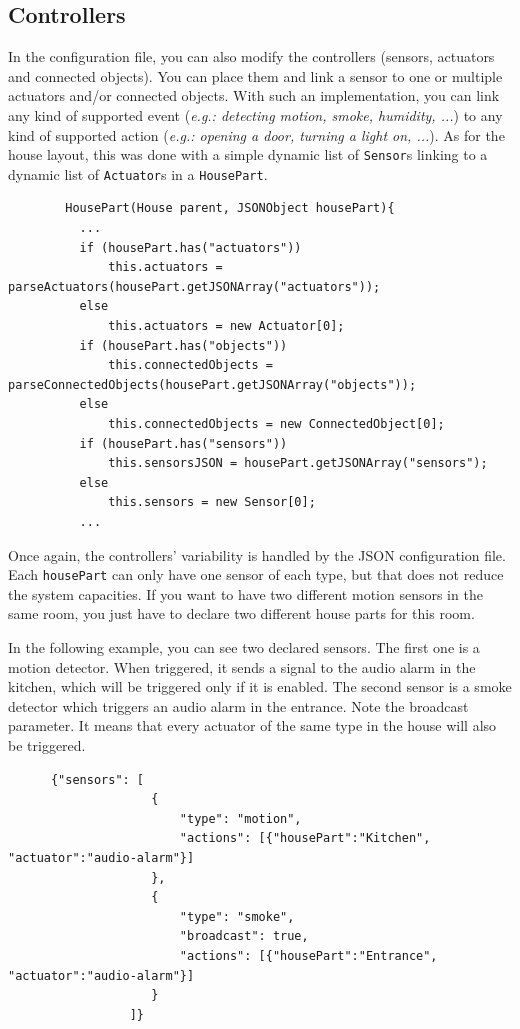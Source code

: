     \subsection{Controllers}
      In the configuration file, you can also modify the controllers (sensors, actuators and connected objects). You can place them and link a sensor to one or multiple actuators and/or connected objects. With such an implementation, you can link any kind of supported event (\emph{e.g.: detecting motion, smoke, humidity, ...}) to any kind of supported action (\emph{e.g.: opening a door, turning a light on, ...}). As for the house layout, this was done with a simple dynamic list of \texttt{Sensor}s linking to a dynamic list of \texttt{Actuator}s in a \texttt{HousePart}.
      \begin{verbatim}
        HousePart(House parent, JSONObject housePart){
          ...
          if (housePart.has("actuators"))
              this.actuators = parseActuators(housePart.getJSONArray("actuators"));
          else
              this.actuators = new Actuator[0];
          if (housePart.has("objects"))
              this.connectedObjects = parseConnectedObjects(housePart.getJSONArray("objects"));
          else
              this.connectedObjects = new ConnectedObject[0];
          if (housePart.has("sensors"))
              this.sensorsJSON = housePart.getJSONArray("sensors");
          else
              this.sensors = new Sensor[0];
          ...
      \end{verbatim}

      Once again, the controllers' variability is handled by the JSON configuration file. Each \texttt{housePart} can only have one sensor of each type, but that does not reduce the system capacities. If you want to have two different motion sensors in the same room, you just have to declare two different house parts for this room.
      
      In the following example, you can see two declared sensors.
      The first one is a motion detector. When triggered, it sends a signal to the audio alarm in the kitchen, which will be triggered only if it is enabled.
      The second sensor is a smoke detector which triggers an audio alarm in the entrance. Note the broadcast parameter. It means that every actuator of the same type in the house will also be triggered.
      
      \begin{verbatim}
      {"sensors": [
                    {
                        "type": "motion",
                        "actions": [{"housePart":"Kitchen", "actuator":"audio-alarm"}]
                    },
                    {
                        "type": "smoke",
                        "broadcast": true,
                        "actions": [{"housePart":"Entrance", "actuator":"audio-alarm"}]
                    }
                 ]}
      \end{verbatim}

